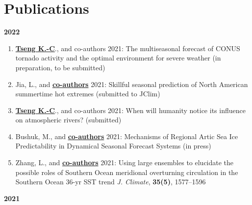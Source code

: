 \documentclass{article}
\begin{document}
\section{\color{airforceblue}Publications}
\normalsize{\bf{2022}} 
\begin{enumerate}  
	\item \normalsize{\bf{\underline{Tseng K.-C}}}., and co-authors 2021: The multiseasonal forecast of CONUS tornado activity and the optimal environment for severe weather (in preparation, to be submitted)
	\item Jia, L., and \normalsize{\bf{\underline{co-authors}}} 2021: Skillful seasonal prediction of North American summertime hot extremes (submitted to JClim)
	\item \normalsize{\bf{\underline{Tseng K.-C}}}., and co-authors 2021: When will humanity notice its influence on atmospheric rivers? (submitted) \par
	\item Bushuk, M., and \normalsize{\bf{\underline{co-authors}}} 2021: Mechanisms of Regional Artic Sea Ice Predictability in Dynamical Seasonal Forecast Systems (in press)
	\item Zhang, L., and \normalsize{\bf{\underline{co-authors}}} 2021: Using large ensembles to elucidate the possible roles of Southern Ocean meridional overturning circulation in the Southern Ocean 36-yr SST trend \textit{J. Climate}, \normalsize{\bf{35(5)}}, 1577--1596
\end{enumerate}
\normalsize{\bf{2021}} 
\end{document}
